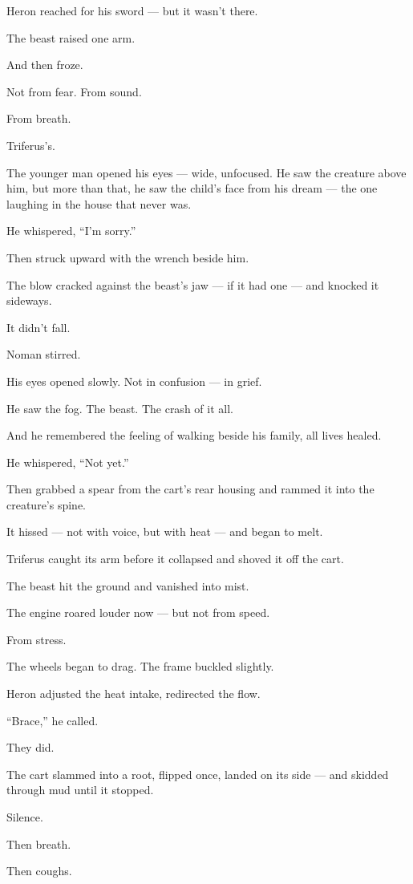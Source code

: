 \documentclass[9pt]{article}
\begin{document}
Heron reached for his sword — but it wasn’t there.

The beast raised one arm.

And then froze.

Not from fear. From sound.

From breath.

Triferus’s.

The younger man opened his eyes — wide, unfocused. He saw the creature above him, but more than that, he saw the child’s face from his dream — the one laughing in the house that never was.

He whispered, “I’m sorry.”

Then struck upward with the wrench beside him.

The blow cracked against the beast’s jaw — if it had one — and knocked it sideways.

It didn’t fall.

Noman stirred.

His eyes opened slowly. Not in confusion — in grief.

He saw the fog. The beast. The crash of it all.

And he remembered the feeling of walking beside his family, all lives healed.

He whispered, “Not yet.”

Then grabbed a spear from the cart’s rear housing and rammed it into the creature’s spine.

It hissed — not with voice, but with heat — and began to melt.

Triferus caught its arm before it collapsed and shoved it off the cart.

The beast hit the ground and vanished into mist.

\bigskip

The engine roared louder now — but not from speed.

From stress.

The wheels began to drag. The frame buckled slightly.

Heron adjusted the heat intake, redirected the flow.

“Brace,” he called.

They did.

The cart slammed into a root, flipped once, landed on its side — and skidded through mud until it stopped.

Silence.

Then breath.

Then coughs.
\end{document}
